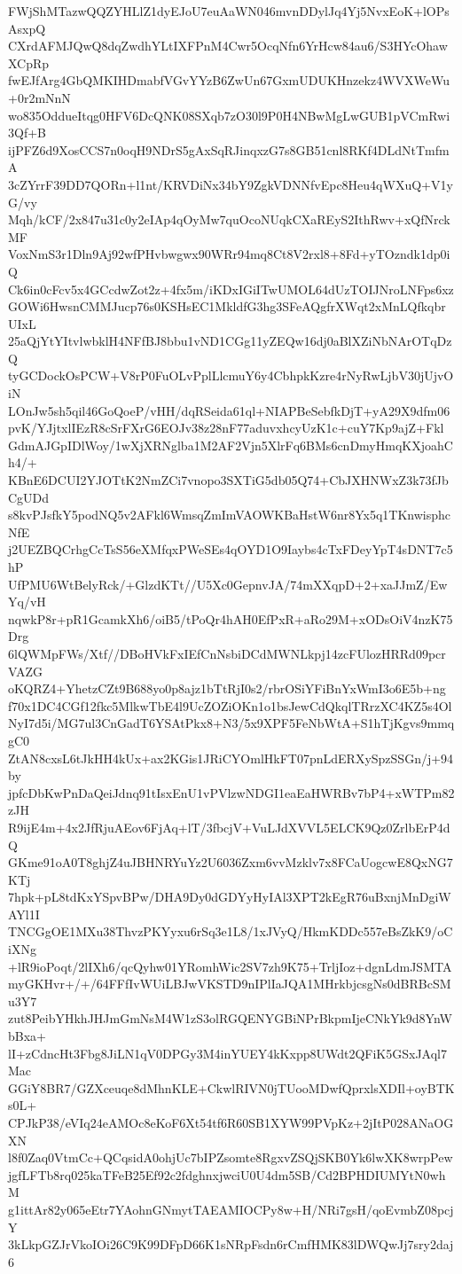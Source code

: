 FWjShMTazwQQZYHLlZ1dyEJoU7euAaWN046mvnDDylJq4Yj5NvxEoK+lOPsAsxpQ
CXrdAFMJQwQ8dqZwdhYLtIXFPnM4Cwr5OcqNfn6YrHcw84au6/S3HYcOhawXCpRp
fwEJfArg4GbQMKIHDmabfVGvYYzB6ZwUn67GxmUDUKHnzekz4WVXWeWu+0r2mNnN
wo835OddueItqg0HFV6DcQNK08SXqb7zO30l9P0H4NBwMgLwGUB1pVCmRwi3Qf+B
ijPFZ6d9XosCCS7n0oqH9NDrS5gAxSqRJinqxzG7s8GB51cnl8RKf4DLdNtTmfmA
3cZYrrF39DD7QORn+l1nt/KRVDiNx34bY9ZgkVDNNfvEpc8Heu4qWXuQ+V1yG/vy
Mqh/kCF/2x847u31c0y2eIAp4qOyMw7quOcoNUqkCXaREyS2IthRwv+xQfNrckMF
VoxNmS3r1Dln9Aj92wfPHvbwgwx90WRr94mq8Ct8V2rxl8+8Fd+yTOzndk1dp0iQ
Ck6in0cFcv5x4GCcdwZot2z+4fx5m/iKDxIGiITwUMOL64dUzTOIJNroLNFps6xz
GOWi6HwsnCMMJucp76s0KSHsEC1MkldfG3hg3SFeAQgfrXWqt2xMnLQfkqbrUIxL
25aQjYtYItvlwbklH4NFfBJ8bbu1vND1CGg11yZEQw16dj0aBlXZiNbNArOTqDzQ
tyGCDockOsPCW+V8rP0FuOLvPplLlcmuY6y4CbhpkKzre4rNyRwLjbV30jUjvOiN
LOnJw5sh5qil46GoQoeP/vHH/dqRSeida61ql+NIAPBeSebfkDjT+yA29X9dfm06
pvK/YJjtxlIEzR8cSrFXrG6EOJv38z28nF77aduvxhcyUzK1c+cuY7Kp9ajZ+Fkl
GdmAJGpIDlWoy/1wXjXRNglba1M2AF2Vjn5XlrFq6BMs6cnDmyHmqKXjoahCh4/+
KBnE6DCUI2YJOTtK2NmZCi7vnopo3SXTiG5db05Q74+CbJXHNWxZ3k73fJbCgUDd
s8kvPJsfkY5podNQ5v2AFkl6WmsqZmImVAOWKBaHstW6nr8Yx5q1TKnwisphcNfE
j2UEZBQCrhgCcTsS56eXMfqxPWeSEs4qOYD1O9Iaybs4cTxFDeyYpT4sDNT7c5hP
UfPMU6WtBelyRck/+GlzdKTt//U5Xc0GepnvJA/74mXXqpD+2+xaJJmZ/EwYq/vH
nqwkP8r+pR1GcamkXh6/oiB5/tPoQr4hAH0EfPxR+aRo29M+xODsOiV4nzK75Drg
6lQWMpFWs/Xtf//DBoHVkFxIEfCnNsbiDCdMWNLkpj14zcFUlozHRRd09pcrVAZG
oKQRZ4+YhetzCZt9B688yo0p8ajz1bTtRjI0s2/rbrOSiYFiBnYxWmI3o6E5b+ng
f70x1DC4CGf12fkc5MlkwTbE4l9UcZOZiOKn1o1bsJewCdQkqlTRrzXC4KZ5s4Ol
NyI7d5i/MG7ul3CnGadT6YSAtPkx8+N3/5x9XPF5FeNbWtA+S1hTjKgvs9mmqgC0
ZtAN8cxsL6tJkHH4kUx+ax2KGis1JRiCYOmlHkFT07pnLdERXySpzSSGn/j+94by
jpfcDbKwPnDaQeiJdnq91tIsxEnU1vPVlzwNDGI1eaEaHWRBv7bP4+xWTPm82zJH
R9ijE4m+4x2JfRjuAEov6FjAq+lT/3fbcjV+VuLJdXVVL5ELCK9Qz0ZrlbErP4dQ
GKme91oA0T8ghjZ4uJBHNRYuYz2U6036Zxm6vvMzklv7x8FCaUogcwE8QxNG7KTj
7hpk+pL8tdKxYSpvBPw/DHA9Dy0dGDYyHyIAl3XPT2kEgR76uBxnjMnDgiWAYl1I
TNCGgOE1MXu38ThvzPKYyxu6rSq3e1L8/1xJVyQ/HkmKDDc557eBsZkK9/oCiXNg
+lR9ioPoqt/2lIXh6/qcQyhw01YRomhWic2SV7zh9K75+TrljIoz+dgnLdmJSMTA
myGKHvr+/+/64FFfIvWUiLBJwVKSTD9nIPlIaJQA1MHrkbjcsgNs0dBRBcSMu3Y7
zut8PeibYHkhJHJmGmNsM4W1zS3olRGQENYGBiNPrBkpmIjeCNkYk9d8YnWbBxa+
lI+zCdncHt3Fbg8JiLN1qV0DPGy3M4inYUEY4kKxpp8UWdt2QFiK5GSxJAql7Mac
GGiY8BR7/GZXceuqe8dMhnKLE+CkwlRIVN0jTUooMDwfQprxlsXDIl+oyBTKs0L+
CPJkP38/eVIq24eAMOc8eKoF6Xt54tf6R60SB1XYW99PVpKz+2jItP028ANaOGXN
l8f0Zaq0VtmCc+QCqsidA0ohjUc7bIPZsomte8RgxvZSQjSKB0Yk6lwXK8wrpPew
jgfLFTb8rq025kaTFeB25Ef92c2fdghnxjwciU0U4dm5SB/Cd2BPHDIUMYtN0whM
g1ittAr82y065eEtr7YAohnGNmytTAEAMIOCPy8w+H/NRi7gsH/qoEvmbZ08pcjY
3kLkpGZJrVkoIOi26C9K99DFpD66K1sNRpFsdn6rCmfHMK83lDWQwJj7sry2daj6
